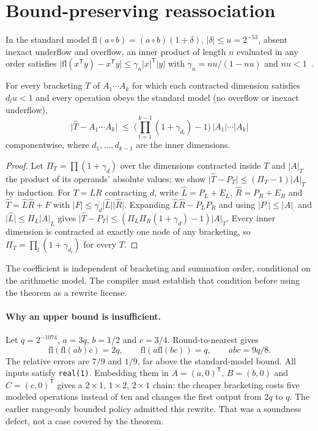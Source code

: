 \documentclass[acmsmall,review,anonymous,nonacm]{acmart}
\newcommand{\fl}{\mathrm{fl}}
\newcommand{\abs}[1]{\lvert #1\rvert}
\begin{document}
\section{Bound-preserving reassociation}\label{sec:bound}
In the standard model $\fl(a\circ b)=(a\circ b)(1+\delta)$, $\abs{\delta}\le
u=2^{-53}$, absent inexact underflow and overflow, an inner product of length $n$
evaluated in any order satisfies $\abs{\fl(x^{\mathsf T}y)-x^{\mathsf T}y}\le
\gamma_n\abs{x}^{\mathsf T}\abs{y}$ with $\gamma_n=nu/(1-nu)$ and
$nu<1$~\cite{higham}.
\begin{theorem}\label{thm:bound}
For every bracketing $T$ of $A_1\cdots A_k$ for which each contracted
dimension satisfies $d_lu<1$ and every operation obeys the standard model
(no overflow or inexact underflow),
\[
\abs{\hat T - A_1\cdots A_k}\;\le\;\Big(\prod_{l=1}^{k-1}(1+\gamma_{d_l})-1\Big)\,
\abs{A_1}\cdots\abs{A_k}
\]
componentwise, where $d_1,\dots,d_{k-1}$ are the inner dimensions.
\end{theorem}
\begin{proof}
Let $\Pi_T=\prod(1+\gamma_{d})$ over the dimensions contracted inside $T$ and
$\abs{A}_T$ the product of its operands' absolute values; we show
$\abs{\hat T-P_T}\le(\Pi_T-1)\abs{A}_T$ by induction. For $T=LR$ contracting
$d$, write $\hat L=P_L+E_L$, $\hat R=P_R+E_R$ and $\hat T=\hat L\hat R+F$ with
$\abs F\le\gamma_d\abs{\hat L}\abs{\hat R}$. Expanding $\hat L\hat R-P_LP_R$ and
using $\abs{P_\cdot}\le\abs{A}_\cdot$ and $\abs{\hat L}\le\Pi_L\abs{A}_L$ gives
$\abs{\hat T-P_T}\le(\Pi_L\Pi_R(1+\gamma_d)-1)\abs{A}_T$. Every inner dimension
is contracted at exactly one node of any bracketing, so
$\Pi_T=\prod_{l}(1+\gamma_{d_l})$ for every $T$.
\end{proof}
The coefficient is independent of bracketing and summation order, conditional
on the arithmetic model. The compiler must establish that condition before
using the theorem as a rewrite license.

\paragraph{Why an upper bound is insufficient.}
Let $q=2^{-1074}$, $a=3q$, $b=1/2$ and $c=3/4$. Round-to-nearest gives
\[
 \fl(\fl(ab)c)=2q,\qquad \fl(a\fl(bc))=q,\qquad abc=9q/8.
\]
The relative errors are $7/9$ and $1/9$, far above the standard-model bound.
All inputs satisfy \texttt{real(1)}. Embedding them in
$A=(a,0)^{\mathsf T}$, $B=(b,0)$ and $C=(c,0)^{\mathsf T}$ gives a
$2\times1$, $1\times2$, $2\times1$ chain: the cheaper bracketing costs five
modeled operations instead of ten and changes the first output from $2q$ to
$q$. The earlier range-only bounded policy admitted this rewrite. That was a
soundness defect, not a case covered by the theorem.
\end{document}
